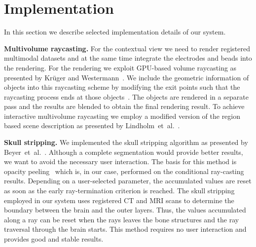 \documentclass{vgtc}                          %
\begin{document}

\section{Implementation}\label{sec:implementation}
In this section we describe selected implementation details of our system.

\noindent \textbf{Multivolume raycasting.} For the contextual view we need to render registered multimodal datasets and at the same time integrate the electrodes and beads into the rendering. For the rendering we exploit GPU-based volume raycasting as presented by Kr\"uger and Westermann~\cite{kr}. We include the geometric information of objects into this raycasting scheme by modifying the exit points such that the raycasting process ends at those objects~\cite{Scharsach}. The objects are rendered in a separate pass and the results are blended to obtain the final rendering result. To achieve interactive multivolume raycasting we employ a modified version of the region based scene description as presented by Lindholm~et~al.~\cite{Lindholm2009}.

\noindent \textbf{Skull stripping.} We implemented the skull stripping algorithm as presented by Beyer~et~al.~\cite{Beyer2007}. Although a complete segmentation would provide better results, we want to avoid the necessary user interaction. The basis for this method is opacity peeling~\cite{Rezk-salama2006} which is, in our case, performed on the conditional ray-casting results. Depending on a user-selected parameter, the accumulated values are reset as soon as the early ray-termination criterion is reached. The skull stripping employed in our system uses registered CT and MRI scans to determine the boundary between the brain and the outer layers. Thus, the values accumulated along a ray can be reset when the rays leaves the bone structures and the ray traversal through the brain starts. This method requires no user interaction and provides good and stable results.
\end{document}
